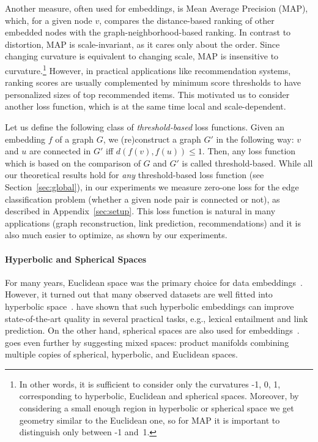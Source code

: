 \documentclass{article} %
\begin{document}
Another measure, often used for embeddings, is Mean Average Precision (MAP), which, for a given node $v$, compares the distance-based ranking of other embedded nodes with the graph-neighborhood-based ranking. In contrast to distortion, MAP is scale-invariant, as it cares only about the order. Since changing curvature is equivalent to changing scale, MAP is insensitive to curvature.\footnote{In other words, it is sufficient to consider only the curvatures -1, 0, 1, corresponding to hyperbolic, Euclidean and spherical spaces. Moreover, by considering a small enough region in hyperbolic or spherical space we get geometry similar to the Euclidean one, so for MAP it is important to distinguish only between -1 and~1.} 
However, in practical applications like recommendation systems, ranking scores are usually complemented by minimum score thresholds to have personalized sizes of top recommended items.
This motivated us to consider another loss function, which is at the same time local and scale-dependent. 

Let us define the following class of \textit{threshold-based} loss functions. Given an embedding $f$ of a graph $G$, we (re)construct a graph $G'$ in the following way: $v$ and $u$ are connected in $G'$ iff $d(f(v),f(u))\le 1$. Then, any loss function which is based on the comparison of $G$ and $G'$ is called threshold-based. While all our theoretical results hold for \textit{any} threshold-based loss function (see Section~\ref{sec:global}), in our experiments we measure zero-one loss for the edge classification problem (whether a given node pair is connected or not), as described in Appendix~\ref{sec:setup}. This loss function is natural in many applications (graph reconstruction, link prediction, recommendations) and it is also much easier to optimize, as shown by our experiments.

\paragraph{Hyperbolic and Spherical Spaces}

For many years, Euclidean space was the primary choice for data embeddings~\citep{goyal2018graph}. However, it turned out that many observed datasets are well fitted into hyperbolic space~\citep{krioukov2010hyperbolic}. \citet{nickel2017poincare} have shown that such hyperbolic embeddings can improve state-of-the-art quality in several practical tasks, e.g., lexical entailment and link prediction. On the other hand, spherical spaces are also used for embeddings~\citep{liu2017sphereface}. \citet{gu2019learning} goes even further by suggesting mixed spaces: product manifolds combining multiple copies of spherical, hyperbolic, and Euclidean spaces. 
\end{document}
